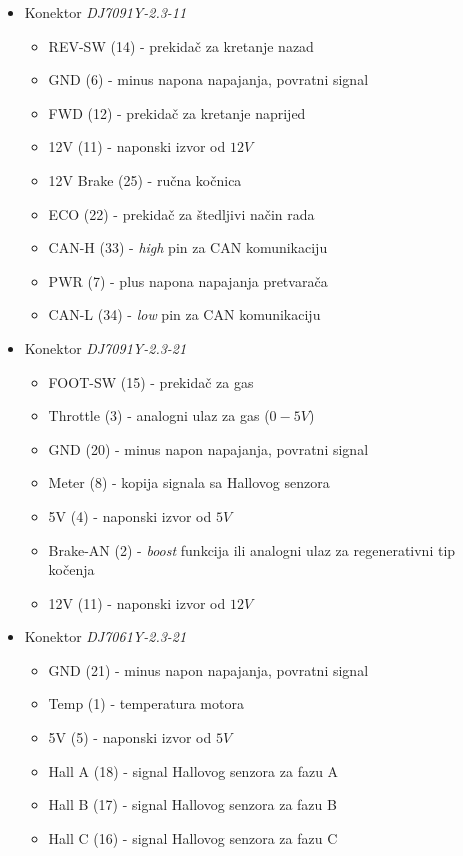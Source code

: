 \begin{itemize}
	\item Konektor \textit{DJ7091Y-2.3-11}
	\begin{itemize}
		\item REV-SW (14) - prekidač za kretanje nazad
		\item GND (6) - minus napona napajanja, povratni signal
		\item FWD (12) - prekidač za kretanje naprijed
		\item 12V (11) - naponski izvor od $12V$
		\item 12V Brake (25) - ručna kočnica
		\item ECO (22) - prekidač za štedljivi način rada
		\item CAN-H (33) - \textit{high} pin za CAN komunikaciju
		\item PWR (7) - plus napona napajanja pretvarača
		\item CAN-L (34) - \textit{low} pin za CAN komunikaciju
	\end{itemize}
	\item Konektor \textit{DJ7091Y-2.3-21}
		\begin{itemize}
		\item FOOT-SW (15) - prekidač za gas
		\item Throttle (3) - analogni ulaz za gas ($0-5V$)
		\item GND (20) - minus napon napajanja, povratni signal
		\item Meter (8) - kopija signala sa Hallovog senzora
		\item 5V (4) - naponski izvor od $5V$
		\item Brake-AN (2) - \textit{boost} funkcija ili analogni ulaz za regenerativni tip kočenja
		\item 12V (11) - naponski izvor od $12V$
	\end{itemize}
	\item Konektor \textit{DJ7061Y-2.3-21}
		\begin{itemize}
		\item GND (21) - minus napon napajanja, povratni signal
		\item Temp (1) - temperatura motora
		\item 5V (5) - naponski izvor od $5V$
		\item Hall A (18) - signal Hallovog senzora za fazu A
		\item Hall B (17) - signal Hallovog senzora za fazu B 
		\item Hall C (16) - signal Hallovog senzora za fazu C 
	\end{itemize}
\end{itemize}

